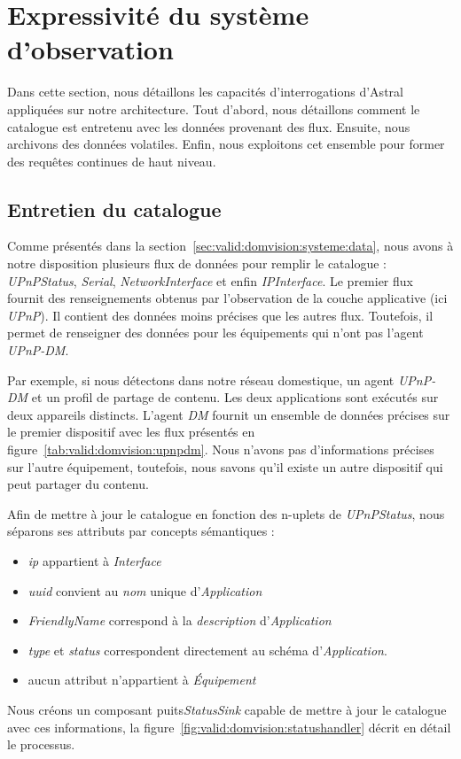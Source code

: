 \section{Expressivité du système d'observation}\label{sec:valid:domvision:requetes}
Dans cette section, nous détaillons les capacités d'interrogations d'Astral appliquées sur notre architecture. Tout d'abord, nous détaillons comment le catalogue est entretenu avec les données provenant des flux. Ensuite, nous archivons des données volatiles. Enfin, nous exploitons cet ensemble pour former des requêtes continues de haut niveau.

\subsection{Entretien du catalogue}
Comme présentés dans la section~\ref{sec:valid:domvision:systeme:data}, nous avons à notre disposition plusieurs flux de données pour remplir le catalogue : \textit{UPnPStatus}, \textit{Serial}, \textit{NetworkInterface} et enfin \textit{IPInterface}. Le premier flux fournit des renseignements obtenus par l'observation de la couche applicative (ici \textit{UPnP}). Il contient des données moins précises que les autres flux. Toutefois, il permet de renseigner des données pour les équipements qui n'ont pas l'agent \textit{UPnP-DM}.

Par exemple, si nous détectons dans notre réseau domestique, un agent \textit{UPnP-DM} et un profil de partage de contenu. Les deux applications sont exécutés sur deux appareils distincts. L'agent \textit{DM} fournit un ensemble de données précises sur le premier dispositif avec les flux présentés en figure~\ref{tab:valid:domvision:upnpdm}. Nous n'avons pas d'informations précises sur l'autre équipement, toutefois, nous savons qu'il existe un autre dispositif qui peut partager du contenu.

Afin de mettre à jour le catalogue en fonction des n-uplets de \textit{UPnPStatus}, nous séparons ses attributs par concepts sémantiques :
\begin{itemize}
\item \textit{ip} appartient à \textit{Interface}
\item \textit{uuid} convient au \textit{nom} unique d'\textit{Application}
\item \textit{FriendlyName} correspond à la \textit{description} d'\textit{Application}
\item \textit{type} et \textit{status} correspondent directement au schéma d'\textit{Application}.
\item aucun attribut n'appartient à \textit{Équipement}
\end{itemize}
Nous créons un composant puits\textit{StatusSink} capable de mettre à jour le catalogue avec ces informations, la figure~\ref{fig:valid:domvision:statushandler} décrit en détail le processus.

